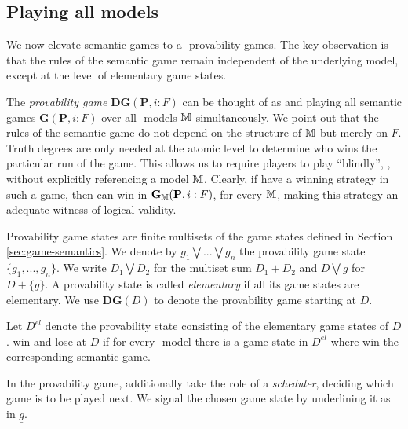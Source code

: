 \subsection{Playing all models}
We now elevate semantic games to a \PNL-provability games. The key observation is that the rules of the semantic game remain independent of the underlying model, except at the level of elementary game states.

The {\em provability game}
$\mathbf{DG}(\mathbf{P},i:F )$ can be thought of as \Me and \You playing all
semantic games $\mathbf{G}(\mathbf{P},i:F )$ over all \PNL-models $\mathbb{M}$
simultaneously. We point out that  the rules of the semantic game do not depend on the structure
of $\mathbb{M}$ but merely on $F $. Truth degrees are only needed at the atomic level
to determine who wins the particular run of the game. This allows us to require
players to play ``blindly'', \ie, without explicitly referencing  a model $\mathbb{M}$.
Clearly, if \Ic have a winning strategy in such a game, then \Ic can win in
$\mathbf{G}_{\mathbb{M}}(\mathbf{P},i:F )$, for every $\mathbb{M}$, making this strategy an
adequate witness of logical validity. 

Provability game states are finite multisets of the game states
defined in Section \ref{sec:game-semantics}. We denote by $g_1 \bigvee ... \bigvee g_n$ 
 the provability game state $\{g_1,...,g_n\}$.
We write $D_1 \bigvee D_2$ for the
multiset sum $D_1+D_2$ and $D\bigvee g$ for $D+\{g\}$. A provability state is
called \emph{elementary} if all its game states are elementary.
We use $\mathbf{DG}(D)$ to denote the provability game starting at $D$. 

\begin{definition}\label{def:win}
Let $D^{el}$ denote the provability state consisting of the elementary game
states of $D$. \Ic win and \You lose at $D$ if for every \PNL-model there is
a game state in $D^{el}$ where \Ic win the corresponding semantic game. 
\end{definition}

In the provability game, \Ic additionally take the
role of a \emph{scheduler}, deciding which game  is to be played next. We
signal the chosen game state by underlining it as in $\underline{g}$.


